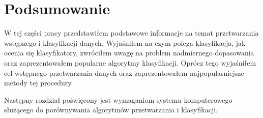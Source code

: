 \documentclass[../thesis.tex]{subfiles}
\begin{document}
\section{Podsumowanie}

W tej części pracy przedstawiłem podstawowe informacje na temat przetwarzania wstępnego i klasyfikacji danych. Wyjaśniłem na czym polega klasyfikacja, jak ocenia się klasyfikatory, zwróciłem uwagę na problem nadmiernego dopasowania oraz zaprezentowałem popularne algorytmy klasyfikacji. Oprócz tego wyjaśniłem cel wstępnego przetwarzania danych oraz zaprezentowałem najpopularniejsze metody tej procedury.

Następny rozdział poświęcony jest wymaganiom systemu komputerowego służącego do porównywania algorytmów przetwarzania i klasyfikacji.
\end{document}
